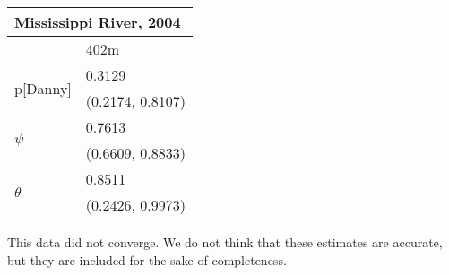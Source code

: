 \documentclass{article}
\begin{document}
    \begin{center}
    \begin{tabular}{|l|l|}
        \hline
        \multicolumn{2}{|l|}{\textbf{Mississippi River, 2004}} \\
        \hline
            & 402m \\
        \hline
        \multirow{2}{*}{p[Danny]}
            & 0.3129 \\
            & (0.2174, 0.8107) \\
        \hline
        \multirow{2}{*}{\(\psi\)}
            & 0.7613 \\
            & (0.6609, 0.8833) \\
        \hline
        \multirow{2}{*}{\(\theta\)}
            & 0.8511 \\
            & (0.2426, 0.9973) \\
        \hline
    \end{tabular}
    \end{center}

    This data did not converge.  We do not think that these estimates are
    accurate, but they are included for the sake of completeness.
    
\end{document}
